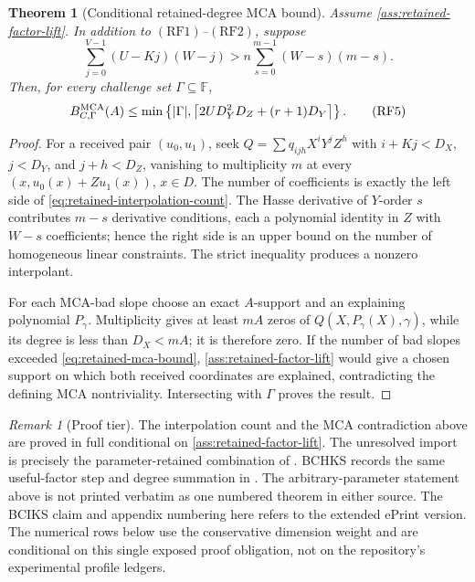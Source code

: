 \documentclass[11pt,a4paper]{amsart}
\numberwithin{equation}{section}
\newtheorem{theorem}{Theorem}[section]
\theoremstyle{remark}
\newtheorem{remark}[remark]{Remark}
\newcommand{\F}{\mathbb F}
\newcommand{\abs}[1]{\lvert #1\rvert}
\newcommand{\ceil}[1]{\left\lceil #1\right\rceil}
\begin{document}
\begin{theorem}[Conditional retained-degree MCA bound]
\label{thm:retained-degree-mca}
Assume \cref{ass:retained-factor-lift}.  In addition to
\((\mathrm{RF1})\)--\((\mathrm{RF2})\), suppose
\[
 \sum_{j=0}^{V-1}(U-Kj)(W-j)
 >n\sum_{s=0}^{m-1}(W-s)(m-s).                   \tag{RF4}
 \label{eq:retained-interpolation-count}
\]
Then, for every challenge set \(\Gamma\subseteq\F\),
\[
 B_{C,\Gamma}^{\rm MCA}(A)
 \le\min\left\{\abs\Gamma,
 \ceil{2UD_Y^2D_Z+(r+1)D_Y}\right\}.             \tag{RF5}
 \label{eq:retained-mca-bound}
\]
\end{theorem}

\begin{proof}
For a received pair \((u_0,u_1)\), seek
\(Q=\sum q_{ijh}X^iY^jZ^h\) with
\(i+Kj<D_X\), \(j<D_Y\), and \(j+h<D_Z\), vanishing to
multiplicity \(m\) at every \((x,u_0(x)+Zu_1(x))\), \(x\in D\).
The number of coefficients is exactly the left side of
\eqref{eq:retained-interpolation-count}.  The Hasse derivative of
\(Y\)-order \(s\) contributes \(m-s\) derivative conditions, each a
polynomial identity in \(Z\) with \(W-s\) coefficients; hence the
right side is an upper bound on the number of homogeneous linear
constraints.  The strict inequality produces a nonzero interpolant.

For each MCA-bad slope choose an exact \(A\)-support and an explaining
polynomial \(P_\gamma\).  Multiplicity gives at least \(mA\) zeros of
\(Q(X,P_\gamma(X),\gamma)\), while its degree is less than
\(D_X<mA\); it is therefore zero.  If the number of bad slopes exceeded
\eqref{eq:retained-mca-bound},
\cref{ass:retained-factor-lift} would give a chosen support on which
both received coordinates are explained, contradicting the defining
MCA nontriviality.  Intersecting with \(\Gamma\) proves the result.
\end{proof}

\begin{remark}[Proof tier]
The interpolation count and the MCA contradiction above are proved in
full conditional on \cref{ass:retained-factor-lift}.  The unresolved
import is precisely the parameter-retained combination of
\cite[Claims~5.7, 5.9--5.10, Lem.~A.1 and Claim~A.2]{BCIKS20}.
BCHKS records the same useful-factor step and degree summation in
\cite[Sec.~3.2]{BCHKS25}.  The arbitrary-parameter statement above is
not printed verbatim as one numbered theorem in either source.  The BCIKS
claim and appendix numbering here refers to the extended ePrint version.
The numerical rows below use the conservative dimension weight and are
conditional on this single exposed proof obligation, not on the
repository's experimental profile ledgers.
\end{remark}
\end{document}
